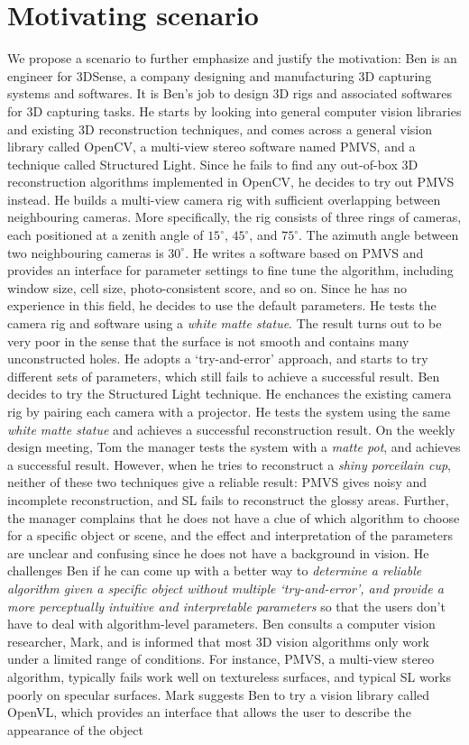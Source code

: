\section{Motivating scenario}
We propose a scenario to further emphasize and justify the motivation: Ben is an engineer for 3DSense, a company designing and manufacturing 3D capturing systems and softwares. It is Ben's job to design 3D rigs and associated softwares for 3D capturing tasks. He starts by looking into general computer vision libraries and existing 3D reconstruction techniques, and comes across a general vision library called OpenCV, a multi-view stereo software named PMVS, and a technique called Structured Light. Since he fails to find any out-of-box 3D reconstruction algorithms implemented in OpenCV, he decides to try out PMVS instead. He builds a multi-view camera rig with sufficient overlapping between neighbouring cameras. More specifically, the rig consists of three rings of cameras, each positioned at a zenith angle of $15^\circ$, $45^\circ$, and $75^\circ$. The azimuth angle between two neighbouring cameras is $30^\circ$. He writes a software based on PMVS and provides an interface for parameter settings to fine tune the algorithm, including window size, cell size, photo-consistent score, and so on. Since he has no experience in this field, he decides to use the default parameters. He tests the camera rig and software using a \textit{white matte statue}. The result turns out to be very poor in the sense that the surface is not smooth and contains many unconstructed holes. He adopts a `try-and-error' approach, and starts to try different sets of parameters, which still fails to achieve a successful result. Ben decides to try the Structured Light technique. He enchances the existing camera rig by pairing each camera with a projector. He tests the system using the same \textit{white matte statue} and achieves a successful reconstruction result. On the weekly design meeting, Tom the manager tests the system with a \textit{matte pot}, and achieves a successful result. However, when he tries to reconstruct a \textit{shiny porceilain cup}, neither of these two techniques give a reliable result: PMVS gives noisy and incomplete reconstruction, and SL fails to reconstruct the glossy areas. Further, the manager complains that he does not have a clue of which algorithm to choose for a specific object or scene, and the effect and interpretation of the parameters are unclear and confusing since he does not have a background in vision. He challenges Ben if he can come up with a better way to \textit{determine a reliable algorithm given a specific object without multiple `try-and-error', and provide a more perceptually intuitive and interpretable parameters} so that the users don't have to deal with algorithm-level parameters. Ben consults a computer vision researcher, Mark, and is informed that most 3D vision algorithms only work under a limited range of conditions. For instance, PMVS, a multi-view stereo algorithm, typically fails work well on textureless surfaces, and typical SL works poorly on specular surfaces. Mark suggests Ben to try a vision library called OpenVL, which provides an interface that allows the user to describe the appearance of the object 
